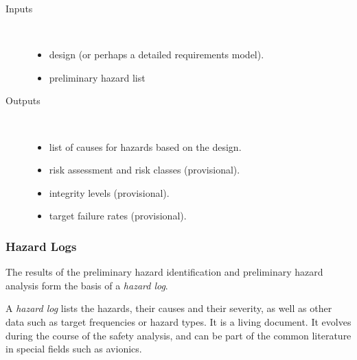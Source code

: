 \begin{description}
   \item[Inputs]\mbox{}\\[-2ex]
    
        \begin{itemize}
	\setlength{\itemsep}{2pt}\setlength{\topsep}{2pt}
        
            \item design (or perhaps a detailed requirements model).
            
            \item preliminary hazard list
        
        \end{itemize}
    
    \item[Outputs]\mbox{}\\[-2ex]
    
        \begin{itemize}
       
            \item list of causes for hazards based on the design.
           
            \item risk assessment and risk classes (provisional).
            
            \item integrity levels (provisional).
            
            \item target failure rates (provisional).

        \end{itemize}

\end{description}



  \subsubsection*{Hazard Logs}

The results of the preliminary hazard identification and preliminary 
hazard analysis form the basis of a \emph{hazard log}.

\begin{definition}
A \emph{hazard log} lists the hazards, their causes and their 
    severity,  as well as other data such as target frequencies or hazard 
    types.
 It is a living document.  It evolves during the course of the
    safety analysis, and can be part of the common literature in special
    fields such as avionics.
\end{definition}

